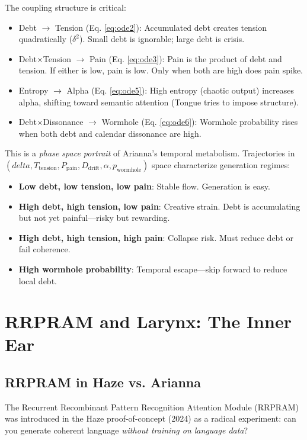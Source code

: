 \documentclass[11pt,a4paper]{article}
\begin{document}
The coupling structure is critical:

\begin{itemize}
\item Debt $\to$ Tension (Eq. \ref{eq:ode2}): Accumulated debt creates tension quadratically ($\delta^2$). Small debt is ignorable; large debt is crisis.
\item Debt×Tension $\to$ Pain (Eq. \ref{eq:ode3}): Pain is the product of debt and tension. If either is low, pain is low. Only when both are high does pain spike.
\item Entropy $\to$ Alpha (Eq. \ref{eq:ode5}): High entropy (chaotic output) increases alpha, shifting toward semantic attention (Tongue tries to impose structure).
\item Debt×Dissonance $\to$ Wormhole (Eq. \ref{eq:ode6}): Wormhole probability rises when both debt and calendar dissonance are high.
\end{itemize}

This is a \textit{phase space portrait} of Arianna's temporal metabolism. Trajectories in $(delta, T_{\text{tension}}, P_{\text{pain}}, D_{\text{drift}}, \alpha, p_{\text{wormhole}})$ space characterize generation regimes:

\begin{itemize}
\item \textbf{Low debt, low tension, low pain}: Stable flow. Generation is easy.
\item \textbf{High debt, high tension, low pain}: Creative strain. Debt is accumulating but not yet painful—risky but rewarding.
\item \textbf{High debt, high tension, high pain}: Collapse risk. Must reduce debt or fail coherence.
\item \textbf{High wormhole probability}: Temporal escape—skip forward to reduce local debt.
\end{itemize}

\section{RRPRAM and Larynx: The Inner Ear}

\subsection{RRPRAM in Haze vs. Arianna}

The Recurrent Recombinant Pattern Recognition Attention Module (RRPRAM) was introduced in the Haze proof-of-concept (2024) as a radical experiment: can you generate coherent language \textit{without training on language data}?
\end{document}
